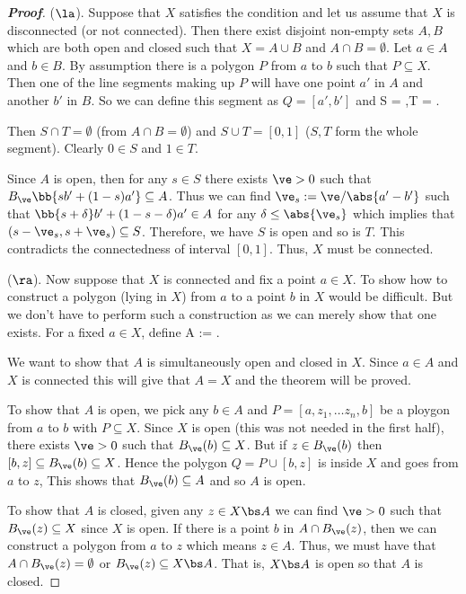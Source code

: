 \begin{proof}[\bf Proof]
($\la$). Suppose that $X$ satisfies the condition and let us assume that $X$ is disconnected (or not connected). Then there exist disjoint non-empty sets $A,B$ which are both open and closed such that $X = A\cup B$ and $A\cap B = \emptyset$. Let $a\in A$ and $b\in B$. By assumption there is a polygon $P$ from $a$ to $b$ such that $P \subseteq X$. Then one of the line segments making up $P$ will have one point $a'$ in $A$ and another $b'$ in $B$. So we can define this segment as $Q = [a',b']$ and
\be
S = ,\qquad T = .
\ee

Then $S\cap T = \emptyset$ (from $A\cap B = \emptyset$) and $S\cup T = [0,1]$ ($S,T$ form the whole segment). Clearly $0\in S$ and $1\in T$.


Since $A$ is open, then for any $s\in S$ there exists $\ve>0$ such that $B_\ve\bb{sb'+ (1-s)a'}\subseteq A$. Thus we can find $\ve_s := \ve/\abs{a'-b'}$ such that $\bb{s+\delta} b'+ (1-s-\delta)a' \in A$ for any $\delta \leq \abs{\ve_s}$ which implies that $(s-\ve_s,s + \ve_s) \subseteq S$. Therefore, we have $S$ is open and so is $T$. This contradicts the connectedness of interval $[0,1]$. Thus, $X$ must be connected.

($\ra$). Now suppose that $X$ is connected and fix a point $a\in X$. To show how to construct a polygon (lying in $X$) from $a$ to a point $b$ in $X$ would be difficult. But we don't have to perform such a construction as we can merely show that one exists. For a fixed $a\in X$, define
\be
A := .
\ee

We want to show that $A$ is simultaneously open and closed in $X$. Since $a\in A$ and $X$ is connected this will give that $A=X$ and the theorem will be proved.

To show that $A$ is open, we pick any $b\in A$ and $P = [a,z_1,\dots z_n,b]$ be a ploygon from $a$ to $b$ with $P\subseteq X$. Since $X$ is open (this was not needed in the first half), there exists $\ve>0$ such that $B_\ve(b)\subseteq X$. But if $z\in B_\ve(b)$ then $[b,z] \subseteq B_\ve(b) \subseteq X$. Hence the polygon $Q = P\cup [b,z]$ is inside $X$ and goes from $a$ to $z$, This shows that $B_\ve(b) \subseteq A$ and so $A$ is open.

To show that $A$ is closed, given any $z\in X\bs A$ we can find $\ve>0$ such that $B_\ve(z)\subseteq X$ since $X$ is open. If there is a point $b$ in $A\cap B_\ve(z)$, then we can construct a polygon from $a$ to $z$ which means $z\in A$. Thus, we must have that $A\cap B_\ve(z) = \emptyset$ or $B_\ve(z) \subseteq X\bs A$. That is, $X\bs A$ is open so that $A$ is closed.
\end{proof}





